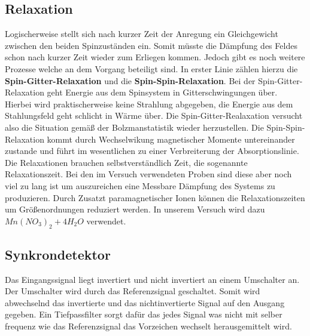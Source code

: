 \documentclass[12pt]{article}
\begin{document}
\subsection{Relaxation}
Logischerweise stellt sich nach kurzer Zeit der Anregung ein Gleichgewicht zwischen den beiden Spinzuständen ein.
Somit müsste die Dämpfung des Feldes schon nach kurzer Zeit wieder zum Erliegen kommen. Jedoch gibt es noch weitere Prozesse welche an dem Vorgang beteiligt sind. In erster Linie zählen hierzu die \textbf{Spin-Gitter-Relaxation} und die \textbf{Spin-Spin-Relaxation}. Bei der Spin-Gitter-Relaxation geht Energie aus dem Spinsystem in Gitterschwingungen über. Hierbei wird praktischerweise keine Strahlung abgegeben, die Energie aus dem Stahlungsfeld geht schlicht in Wärme über. Die Spin-Gitter-Realaxation versucht also die Situation gemäß der Bolzmanstatistik wieder herzustellen. Die Spin-Spin-Relaxation kommt durch Wechselwikung magnetischer Momente untereinander zustande und führt im wesentlichen zu einer Verbreiterung der Absorptionslinie.\\

Die Relaxationen brauchen selbstverständlich Zeit, die sogenannte Relaxationszeit. Bei den im Versuch verwendeten Proben sind diese aber noch viel zu lang ist um auszureichen eine Messbare Dämpfung des Systems zu produzieren. Durch Zusatzt paramagnetischer Ionen können die Relaxationszeiten um Größenordnungen reduziert werden. In unserem Versuch wird dazu $Mn(NO_3)_2 + 4H_2O$ verwendet.

\subsection{Synkrondetektor}
Das Eingangssignal liegt invertiert und nicht invertiert an einem Umschalter an. Der Umschalter wird durch das Referenzsignal geschaltet. Somit wird abwechselnd das invertierte und das nichtinvertierte Signal auf den Ausgang gegeben. Ein Tiefpassfilter sorgt dafür das jedes Signal was nicht mit selber frequenz wie das Referenzsignal das Vorzeichen wechselt herausgemittelt wird.\\
\end{document}

